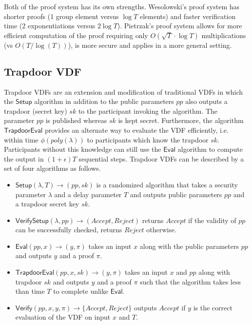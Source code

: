 \documentclass[letterpaper,twocolumn,10pt]{article}
\theoremstyle{definition}
\theoremstyle{remark}
\begin{document}
Both of the proof system has its own strengths. Wesolowski's proof system has shorter proofs (1 group element versus $\log T$ elements) and faster verification time (2 exponentiations versus $2 \log T$). Pietrzak's proof system allows for more efficient computation of the proof requiring only $O(\sqrt{T} \cdot \log T)$ multiplications (vs $O(T/\log (T))$), is more secure and applies in a more general setting.

\subsection{Trapdoor VDF}
\label{appendix:tvdf}
Trapdoor VDFs \cite{wesolowski2019efficient, schindler2021randrunner} are an extension and modification of traditional VDFs in which the $\mathsf{Setup}$ algorithm in addition to the public parameters $pp$ also outputs a trapdoor (secret key) $sk$ to the participant invoking the algorithm.  The parameter $pp$ is published whereas $sk$ is kept secret. Furthermore, the algorithm $\mathsf{TrapdoorEval}$ provides an alternate way to evaluate the VDF efficiently, i.e. within time $\phi{(poly{(\lambda)})}$ to participants which know the trapdoor $sk$. Participants without this knowledge can still use the $\mathsf{Eval}$ algorithm to compute the output in $(1+\epsilon)T$ sequential steps.
Trapdoor VDFs can be described by a set of four algorithms as follows.
\begin{itemize}
    \item $\mathsf{Setup}(\lambda, T) \rightarrow (pp, sk)$ is a randomized algorithm that takes a security parameter $\lambda$ and a delay parameter $T$ and outputs public parameters $pp$ and a trapdoor secret key $sk$.
    \item $\mathsf{VerifySetup}(\lambda, pp) \rightarrow (Accept, Reject)$ returns $Accept$ if the validity of $pp$ can be successfully checked, returns $Reject$ otherwise.
    \item $\mathsf{Eval}(pp, x) \rightarrow (y, \pi)$ takes an input $x$ along with the public parameters $pp$ and outputs $y$ and a proof $\pi$.
    \item $\mathsf{TrapdoorEval}(pp,x,sk) \rightarrow (y, \pi)$ takes an input $x$ and $pp$ along with trapdoor $sk$ and outputs $y$ and a proof $\pi$ such that the algorithm takes less than time $T$ to complete unlike $\mathsf{Eval}$.
    \item $\mathsf{Verify}(pp, x, y, \pi) \rightarrow \{Accept, Reject\}$ outputs $Accept$ if $y$ is the correct evaluation of the VDF on input $x$ and $T$.
\end{itemize}
\end{document}
